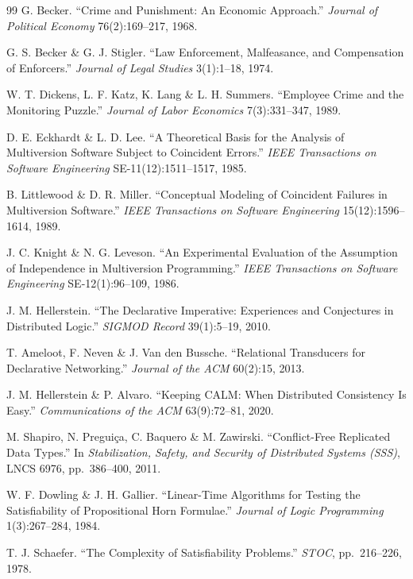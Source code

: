 \documentclass[11pt,a4paper]{article}
\theoremstyle{definition}
\theoremstyle{definition}
\theoremstyle{remark}
\begin{document}
\begin{thebibliography}{99}
 G. Becker. ``Crime and Punishment: An Economic Approach.''
\emph{Journal of Political Economy} 76(2):169--217, 1968.

 G. S. Becker \& G. J. Stigler. ``Law Enforcement,
Malfeasance, and Compensation of Enforcers.'' \emph{Journal of Legal Studies}
3(1):1--18, 1974.

 W. T. Dickens, L. F. Katz, K. Lang \& L. H. Summers.
``Employee Crime and the Monitoring Puzzle.'' \emph{Journal of Labor Economics}
7(3):331--347, 1989.

 D. E. Eckhardt \& L. D. Lee. ``A Theoretical Basis for the
Analysis of Multiversion Software Subject to Coincident Errors.'' \emph{IEEE
Transactions on Software Engineering} SE-11(12):1511--1517, 1985.

 B. Littlewood \& D. R. Miller. ``Conceptual Modeling of
Coincident Failures in Multiversion Software.'' \emph{IEEE Transactions on
Software Engineering} 15(12):1596--1614, 1989.

 J. C. Knight \& N. G. Leveson. ``An Experimental Evaluation
of the Assumption of Independence in Multiversion Programming.'' \emph{IEEE
Transactions on Software Engineering} SE-12(1):96--109, 1986.

 J. M. Hellerstein. ``The Declarative Imperative:
Experiences and Conjectures in Distributed Logic.'' \emph{SIGMOD Record}
39(1):5--19, 2010.

 T. Ameloot, F. Neven \& J. Van den Bussche.
``Relational Transducers for Declarative Networking.'' \emph{Journal of the
ACM} 60(2):15, 2013.

 J. M. Hellerstein \& P. Alvaro. ``Keeping CALM: When
Distributed Consistency Is Easy.'' \emph{Communications of the ACM}
63(9):72--81, 2020.

 M. Shapiro, N. Pregui\c{c}a, C. Baquero \& M. Zawirski.
``Conflict-Free Replicated Data Types.'' In \emph{Stabilization, Safety, and
Security of Distributed Systems (SSS)}, LNCS 6976, pp.~386--400, 2011.

 W. F. Dowling \& J. H. Gallier. ``Linear-Time Algorithms for Testing
the Satisfiability of Propositional Horn Formulae.'' \emph{Journal of Logic
Programming} 1(3):267--284, 1984.

 T. J. Schaefer. ``The Complexity of Satisfiability Problems.''
\emph{STOC}, pp.~216--226, 1978.


\end{thebibliography}
\end{document}
